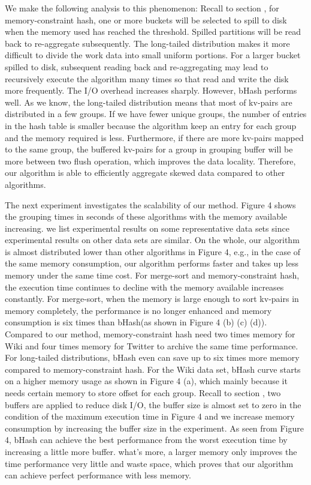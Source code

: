 We make the following analysis to this phenomenon:  Recall to section \uppercase\expandafter{}, for memory-constraint hash, one or more buckets will be selected to spill to disk when the memory used has reached the threshold. Spilled partitions will be read back to re-aggregate subsequently. The long-tailed distribution makes it more difficult to divide the work data into small uniform portions. For a larger bucket spilled to disk, subsequent reading back and re-aggregating may lead to recursively execute the algorithm many times so that read and write the disk more frequently. The I/O overhead increases sharply. However, bHash performs well. As we know, the long-tailed distribution means that most of kv-pairs are distributed in a few groups. If we have fewer unique groups, the number of entries in the hash table is smaller because the algorithm keep an entry for each group and the memory required is less. Furthermore, if there are more kv-pairs mapped to the same group, the buffered kv-pairs for a group in grouping buffer will be more between two flush operation, which improves the data locality. Therefore, our algorithm is able to efficiently aggregate skewed data compared to other algorithms.

The next experiment investigates the scalability of our method. Figure 4 shows the grouping times in seconds of these algorithms with the memory available increasing. we list experimental results on some representative data sets since experimental results on other data sets are similar. On the whole, our algorithm is almost distributed lower than other algorithms in Figure 4, e.g., in the case of the same memory consumption, our algorithm performs faster and takes up less memory under the same time cost. For merge-sort and memory-constraint hash, the execution time continues to decline with the memory available increases constantly. For merge-sort, when the memory is large enough to sort kv-pairs in memory completely, the performance is no longer enhanced and memory consumption is six times than bHash(as shown in Figure 4 (b) (c) (d)). Compared to our method, memory-constraint hash need two times memory for Wiki and four times memory for Twitter to archive the same time performance. For long-tailed distributions, bHash even can save up to six times more memory compared to memory-constraint hash. For the Wiki data set, bHash curve starts on a higher memory usage as shown in Figure 4 (a), which mainly because it needs certain memory to store offset for each group. Recall to section \uppercase\expandafter{}, two buffers are applied to reduce disk I/O, the buffer size is almost set to zero in the condition of the maximum execution time in Figure 4 and we increase memory consumption by increasing the buffer size in the experiment. As seen from Figure 4, bHash can achieve the best performance from the worst execution time by increasing a little more buffer. what's more, a larger memory only improves the time performance very little and waste space, which proves that our algorithm can achieve perfect performance with less memory.

